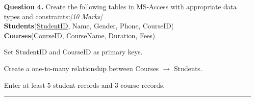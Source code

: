 \documentclass[11pt,a4paper]{article}
\newcommand{\pts}[1]{\hfill   \textit{[#1]}}
\begin{document}
\bigskip



\noindent   \textbf{Question 4.} Create the following tables in MS-Access with appropriate data types and constraints:\pts{10 Marks}\\
   \textbf{Students}(\underline{StudentID}, Name, Gender, Phone, CourseID)\\
   \textbf{Courses}(\underline{CourseID}, CourseName, Duration, Fees)

\begin{parts}
  \item Set StudentID and CourseID as primary keys.
  \item Create a one-to-many relationship between Courses $\rightarrow$ Students.
  \item Enter at least 5 student records and 3 course records.
\end{parts}

\vfill\rule{\linewidth}{0.4pt}
\end{document}
